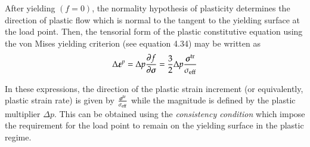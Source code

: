 After yielding $(f = 0)$, the normality hypothesis of plasticity determines the direction of plastic flow which is normal to the tangent to the yielding surface at the load point. Then, the tensorial form of the plastic constitutive equation using the von Mises yielding criterion (see equation 4.34) may be written as
\begin{equation} \label{eqn:smm:constitutive:plastic contitutive equation}
  \Delta {\ensuremath{\boldsymbol{\varepsilon}}}^p = \Delta p \frac {\partial{f}}{\partial{\ensuremath{\boldsymbol{\sigma}}}}=\frac{3}{2} \Delta p \frac{{\boldsymbol{\sigma}}^{{\mathrm{tr}}}}{\sigma_{{\mathrm{eff}}}}
\end{equation}

In these expressions, the direction of the plastic strain increment (or equivalently, plastic strain rate) is given by $\frac{{\boldsymbol{\sigma}}^{{\mathrm{tr}}}}{\sigma_{{\mathrm{eff}}}}$ while the magnitude is defined by the plastic multiplier $\Delta p$. This can be obtained using the \emph{consistency condition} which impose the requirement for the load point to remain on the yielding surface in the plastic regime.

